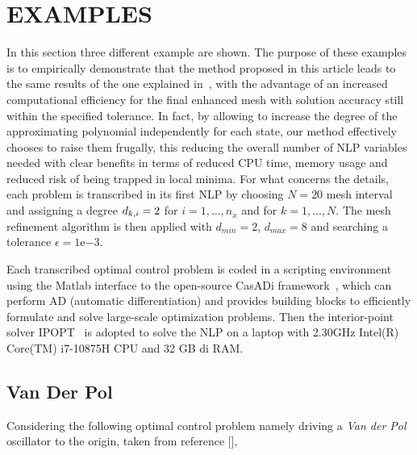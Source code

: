 \section*{EXAMPLES}
In this section three different example are shown. The purpose of these examples is to empirically demonstrate that the method proposed in this article leads to the same results of the one explained in~\cite{Patterson:OCAM:2015}, with the advantage of an increased computational efficiency for the final enhanced mesh with solution accuracy still within the specified tolerance. In fact, by allowing to increase the degree of the approximating polynomial independently for each state, our method effectively chooses to raise them frugally, this reducing the overall number of NLP variables needed with clear benefits in terms of reduced CPU time, memory usage and reduced risk of being trapped in local minima.
For what concerns the details, each problem is transcribed in its first NLP by choosing $N = 20$ mesh interval and assigning a degree $d_{k,i} = 2$ for $i = 1, \dots, n_x$ and for $k = 1, \dots, N$. The mesh refinement algorithm is then applied with $d_{min} = 2$, $d_{max} = 8$ and searching a tolerance $\epsilon = 1\mathrm{e}{-3}$.

Each transcribed optimal control problem is coded in a scripting environment using the
Matlab interface to the open-source CasADi framework~\cite{casadi:MPC:2019}, which can perform AD (automatic differentiation) and provides building blocks to efficiently formulate and solve large-scale optimization problems. Then the interior-point solver IPOPT~\cite{Biegler:CCE:2009} is adopted to solve the NLP on a laptop with 2.30GHz Intel(R) Core(TM) i7-10875H CPU and 32 GB di RAM.


\subsection*{Van Der Pol}
Considering the following optimal control problem namely
driving a \emph{Van der Pol} oscillator to the origin, taken from reference [],

